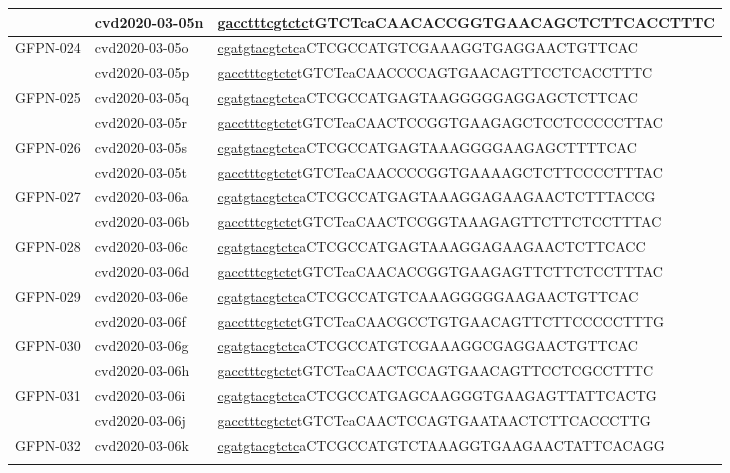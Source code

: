 \begin{landscape}
\begin{longtable}{|l|l|l|}
		& cvd2020-03-05n & \underline{gacctttcgtctc}tGTCTcaCAACACCGGTGAACAGCTCTTCACCTTTC  \\ \hline
		\multirow{2}{*}{GFPN-024} & cvd2020-03-05o & \underline{cgatgtacgtctc}aCTCGCCATGTCGAAAGGTGAGGAACTGTTCAC     \\ \cline{2-3} 
		& cvd2020-03-05p & \underline{gacctttcgtctc}tGTCTcaCAACCCCAGTGAACAGTTCCTCACCTTTC  \\ \hline
		\multirow{2}{*}{GFPN-025} & cvd2020-03-05q & \underline{cgatgtacgtctc}aCTCGCCATGAGTAAGGGGGAGGAGCTCTTCAC     \\ \cline{2-3} 
		& cvd2020-03-05r & \underline{gacctttcgtctc}tGTCTcaCAACTCCGGTGAAGAGCTCCTCCCCCTTAC \\ \hline
		\multirow{2}{*}{GFPN-026} & cvd2020-03-05s & \underline{cgatgtacgtctc}aCTCGCCATGAGTAAAGGGGAAGAGCTTTTCAC     \\ \cline{2-3} 
		& cvd2020-03-05t & \underline{gacctttcgtctc}tGTCTcaCAACCCCGGTGAAAAGCTCTTCCCCTTTAC \\ \hline
		\multirow{2}{*}{GFPN-027} & cvd2020-03-06a & \underline{cgatgtacgtctc}aCTCGCCATGAGTAAAGGAGAAGAACTCTTTACCG   \\ \cline{2-3} 
		& cvd2020-03-06b & \underline{gacctttcgtctc}tGTCTcaCAACTCCGGTAAAGAGTTCTTCTCCTTTAC \\ \hline
		\multirow{2}{*}{GFPN-028} & cvd2020-03-06c & \underline{cgatgtacgtctc}aCTCGCCATGAGTAAAGGAGAAGAACTCTTCACC    \\ \cline{2-3} 
		& cvd2020-03-06d & \underline{gacctttcgtctc}tGTCTcaCAACACCGGTGAAGAGTTCTTCTCCTTTAC \\ \hline
		\multirow{2}{*}{GFPN-029} & cvd2020-03-06e & \underline{cgatgtacgtctc}aCTCGCCATGTCAAAGGGGGAAGAACTGTTCAC     \\ \cline{2-3} 
		& cvd2020-03-06f & \underline{gacctttcgtctc}tGTCTcaCAACGCCTGTGAACAGTTCTTCCCCCTTTG \\ \hline
		\multirow{2}{*}{GFPN-030} & cvd2020-03-06g & \underline{cgatgtacgtctc}aCTCGCCATGTCGAAAGGCGAGGAACTGTTCAC     \\ \cline{2-3} 
		& cvd2020-03-06h & \underline{gacctttcgtctc}tGTCTcaCAACTCCAGTGAACAGTTCCTCGCCTTTC  \\ \hline
		\multirow{2}{*}{GFPN-031} & cvd2020-03-06i & \underline{cgatgtacgtctc}aCTCGCCATGAGCAAGGGTGAAGAGTTATTCACTG   \\ \cline{2-3} 
		& cvd2020-03-06j & \underline{gacctttcgtctc}tGTCTcaCAACTCCAGTGAATAACTCTTCACCCTTG  \\ \hline
		\multirow{2}{*}{GFPN-032} & cvd2020-03-06k & \underline{cgatgtacgtctc}aCTCGCCATGTCTAAAGGTGAAGAACTATTCACAGG  \\ \cline{2-3} 

\end{longtable}
\end{landscape}

